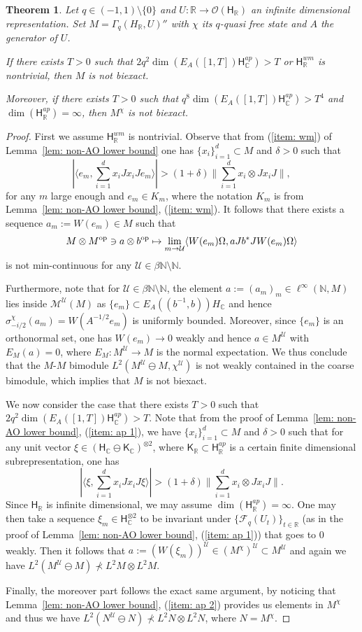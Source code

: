 \documentclass[a4paper,11pt]{amsart}
\newtheorem{thm}{Theorem}[section]
\theoremstyle{definition}
\newcommand{\C}{{\mathbb C}}
\newcommand{\N}{{\mathbb N}}
\newcommand{\R}{{\mathbb R}}
\newcommand{\cF}{{\mathcal F}}
\newcommand{\cM}{{\mathcal M}}
\newcommand{\cO}{{\mathcal O}}
\newcommand{\cU}{{\mathcal U}}
\newcommand{\sH}{\mathsf{H}}
\newcommand{\sK}{\mathsf{K}}
\newcommand{\ot}{\otimes}
\newcommand{\op}{{\rm op}}
\begin{document}
\begin{thm}\label{thm: non biexact}
Let $q\in (-1,1)\setminus\{0\}$ and $U:\R\to \cO(\sH_\R)$ an infinite dimensional representation.
Set $M=\Gamma_q(H_\R, U)''$ with $\chi$ its $q$-quasi free state and $A$ the generator of $U$.

If there exists $T>0$ such that $2q^2 \dim( E_A([1,T]) \sH_\C^{ap})>T$ or $\sH_\R^{wm}$ is nontrivial, then $M$ is not biexact.

Moreover, if there exists $T>0$ such that $q^8 \dim(E_A([1,T]) \sH_\C^{ap})>T^4$ and $\dim(\sH_\R^{ap})=\infty$, then $M^\chi$ is not biexact.
\end{thm}
\begin{proof}
First we assume $\sH_\R^{wm}$ is nontrivial.
Observe that from  (\ref{item: wm}) of Lemma~\ref{lem: non-AO lower bound} one has $\{x_i\}_{i=1}^d\subset M$ and $\delta>0$ such that
$$
|\langle e_m, \sum_{i=1}^d x_i Jx_i J e_m\rangle|>(1+\delta)\|\sum_{i=1}^d x_i\ot Jx_i J\|,
$$
for any $m$ large enough and $e_m\in K_m$, where the notation $K_m$ is from Lemma~\ref{lem: non-AO lower bound}, (\ref{item: wm}).
It follows that there exists a sequence $a_m:=W(e_m)\in M$
	such that 
$$
M\ot M^{\op}\ni a\ot b^{\op}\mapsto \lim_{m\to \cU} \langle W(e_m)\Omega, a Jb^*J W(e_m)\Omega\rangle
$$
is not min-continuous for any $\cU\in \beta\N\setminus \N$.

Furthermore, note that for $\cU\in \beta\N\setminus \N$, the element $a:=(a_m)_m\in \ell^\infty(\N, M)$ lies inside $\cM^\cU(M)$
	as $\{e_m\}\subset E_A( (b^{-1}, b))H_\C$ and hence $\sigma_{-i/2}^\chi(a_m)=W(A^{-1/2}e_m)$ is uniformly bounded.
Moreover, since $\{e_m\}$ is an orthonormal set, one has $W(e_m)\to 0$ weakly and hence $a\in M^\cU$ with $E_M(a)=0$,
	where $E_M: M^\cU\to M$ is the normal expectation.
We thus conclude that the $M$-$M$ bimodule $L^2(M^\cU\ominus M, \chi^\cU)$ is not weakly contained in the coarse bimodule,
	which implies that $M$ is not biexact.
	
We now consider the case that there exists $T>0$ such that $2q^2 \dim( E_A([1,T]) \sH_\C^{ap})>T$.
Note that from the proof of Lemma~\ref{lem: non-AO lower bound}, (\ref{item: ap 1}), we have $\{x_i\}_{i=1}^d\subset M$ and $\delta>0$ such that
	for any unit vector $\xi \in (\sH_\C\ominus \sK_\C)^{\ot 2}$, where $\sK_\R \subset \sH_\R^{ap}$ is a certain finite dimensional subrepresentation,
	one has
$$|\langle \xi, \sum_{i=1}^d x_i Jx_i J \xi \rangle|>(1+\delta)\|\sum_{i=1}^d x_i\ot Jx_i J\|.$$
Since $\sH_\R$ is infinite dimensional, we may assume $\dim(\sH_\R^{ap})=\infty$.
One may then take a sequence $\xi_m\in \sH_\C^{\ot 2}$ to be invariant under $\{\cF_q(U_t)\}_{t\in\R}$
	(as in the proof of Lemma~\ref{lem: non-AO lower bound}, (\ref{item: ap 1})) that goes to $0$ weakly.
Then it follows that $a:=(W(\xi_m))^\cU\in (M^\chi)^\cU\subset M^\cU$
	and again we have $L^2(M^\cU\ominus M)\not\prec L^2M\ot L^2M$.
	
Finally, the moreover part follows the exact same argument, by noticing that Lemma~\ref{lem: non-AO lower bound}, (\ref{item: ap 2})
	provides us elements in $M^\chi$ 
	and thus we have $L^2(N^\cU\ominus N)\not\prec L^2N\ot L^2N$,
	where $N=M^\chi$.
\end{proof}
\end{document}
